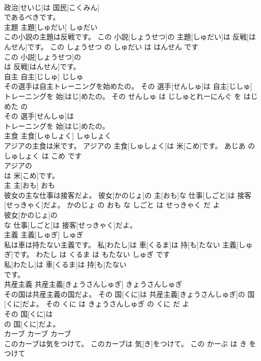 \documentclass[8pt]{extreport}
\begin{document}
\begin{CJK}{UTF8}{min}
\\	政治[せいじ]は 国民[こくみん]
\\	であるべきです。			
\\	主題	主題[しゅだい]	しゅだい	
\\	この小説の主題は反戦です。	この 小説[しょうせつ]の 主題[しゅだい]は 反戦[はんせん]です。	この しょうせつ の しゅだい は はんせん です	
\\	この 小説[しょうせつ]の
\\	は 反戦[はんせん]です。			
\\	自主	自主[じしゅ]	じしゅ	
\\	その選手は自主トレーニングを始めたの。	その 選手[せんしゅ]は 自主[じしゅ]トレーニングを 始[はじ]めたの。	その せんしゅ は じしゅとれーにんぐ を はじめた の	
\\	その 選手[せんしゅ]は
\\	トレーニングを 始[はじ]めたの。			
\\	主食	主食[しゅしょく]	しゅしょく	
\\	アジアの主食は米です。	アジアの 主食[しゅしょく]は 米[こめ]です。	あじあ の しゅしょく は こめ です	
\\	アジアの
\\	は 米[こめ]です。			
\\	主	主[おも]	おも	
\\	彼女の主な仕事は接客だよ。	彼女[かのじょ]の 主[おも]な 仕事[しごと]は 接客[せっきゃく]だよ。	かのじょ の おも な しごと は せっきゃく だ よ	
\\	彼女[かのじょ]の
\\	な 仕事[しごと]は 接客[せっきゃく]だよ。			
\\	主義	主義[しゅぎ]	しゅぎ	
\\	私は車は持たない主義です。	私[わたし]は 車[くるま]は 持[も]たない 主義[しゅぎ]です。	わたし は くるま は もたない しゅぎ です	
\\	私[わたし]は 車[くるま]は 持[も]たない
\\	です。			
\\	共産主義	共産主義[きょうさんしゅぎ]	きょうさんしゅぎ	
\\	その国は共産主義の国だよ。	その 国[くに]は 共産主義[きょうさんしゅぎ]の 国[くに]だよ。	その くに は きょうさんしゅぎ の くに だ よ	
\\	その 国[くに]は
\\	の 国[くに]だよ。			
\\	カーブ	カーブ	カーブ	
\\	このカーブは気をつけて。	このカーブは 気[き]をつけて。	この かーぶ は き を つけて	

\end{CJK}
\end{document}
